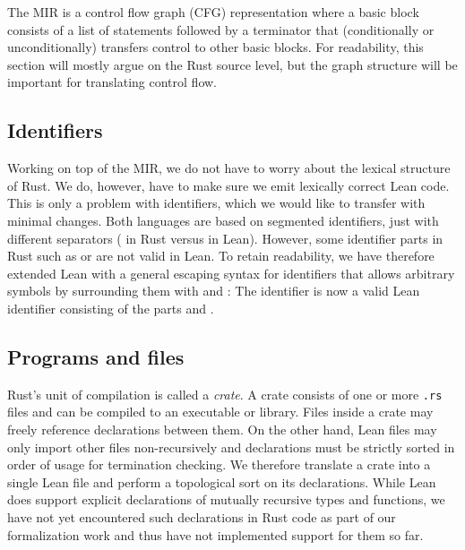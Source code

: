 The MIR is a control flow graph (CFG) representation where a basic block consists
of a list of statements followed by a terminator that (conditionally or
unconditionally) transfers control to other basic blocks. For readability,
this section will mostly argue on the Rust source level, but the graph structure
will be important for translating control flow.


\subsection{Identifiers}

Working on top of the MIR, we do not have to worry about the lexical structure
of Rust. We do, however, have to make sure we emit lexically correct Lean code.
This is only a problem with identifiers, which we would like to transfer with
minimal changes. Both languages are based on segmented identifiers, just with
different separators ( in Rust versus  in Lean).
However, some identifier parts in Rust such as \rust{[T]} or 
are not valid in Lean. To retain readability, we have therefore extended Lean
with a general escaping syntax for identifiers that allows arbitrary symbols by
surrounding them with  and : The identifier 
is now a valid Lean identifier consisting of the parts  and
.

\subsection{Programs and files}

Rust's unit of compilation is called a \emph{crate}. A crate consists of one or
more \texttt{.rs} files and can be compiled to an executable or library. Files
inside a crate may freely reference declarations between them. On the other
hand, Lean files may only import other files non-recursively and declarations
must be strictly sorted in order of usage for termination checking. We therefore
translate a crate into a single Lean file and perform a topological sort on its
declarations. While Lean does support explicit declarations of mutually
recursive types and functions, we have not yet encountered such declarations in
Rust code as part of our formalization work and thus have not implemented support for them so far.

